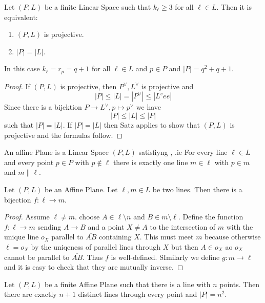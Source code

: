 \begin{Satz}
Let \((P,L)\) be a finite Linear Space such that \(k_\ell\geq 3\) for all \(\ell\in L\).
Then it is equivalent:
\begin{enumerate}
    \item \((P,L)\) is projective.
    \item \(|P|=|L|\).
\end{enumerate}
In this case \(k_\ell=r_{p}=q+1\) for all \(\ell\in L\) and \(p\in P\) and 
\(|P|=q^2+q+1\).
\end{Satz}
\begin{proof}
If \((P,L)\) is projective, then \(P^\vee,L^\vee\) is projective and 
\[|P|\leq |L|=|P^\vee|\leq |L^vee|\] 
Since there is a bijektion \(P\to L^\vee, p\mapsto p^\vee\) we have 
\[|P|\leq |L|\leq |P|\] such that 
\(|P|=|L|\).
If \(|P|=|L|\) then Satz applies to show that \((P,L)\) is projective and the formulas follow.
\end{proof}
\begin{Def}
    An affine Plane is a Linear Space \((P,L)\) satisfiyng , .ie
    For every line \(\ell\in L\) and every point \(p\in P\) with \(p\not\in\ell\) there is exactly 
    one line \(m\in\ell\) with \(p\in m\) and \(m\parallel \ell\).

\end{Def}
\begin{Satz}
Let \((P,L)\) be an Affine Plane.
Let \(\ell,m\in L\) be two lines. Then there is a bijection 
\(f\colon \ell\to m\).
\end{Satz}
\begin{proof}
Assume \(\ell\neq m\).
choose \(A\in \ell\setminus n\) and \(B\in m\setminus\ell\).
Define the function 
\(f\colon \ell\to m\) sending \(A\to B\) and a point \(X\neq A\) to the intersection of 
\(m\) with the unique line \(o_X\) parallel to \(\overline{AB}\) containing \(X\).
This must meet \(m\) because otherwise \(\ell=o_X\) by the uniqeness of parallel lines through \(X\)
but then \(A\in o_X\) ao \(o_X\) cannot be parallel to \(\overline{AB}\).
Thus \(f\) is well-defined.
SImilarly we define \(g\colon m\to \ell\) and it is easy to check that they are 
mutually inverse.
\end{proof}
\begin{Satz}
Let \((P,L)\) be a finite Affine Plane such that there is a line with \(n\) points.
Then there are exactly \(n+1\) distinct lines through every point and 
\(|P|=n^2\).
\end{Satz}
